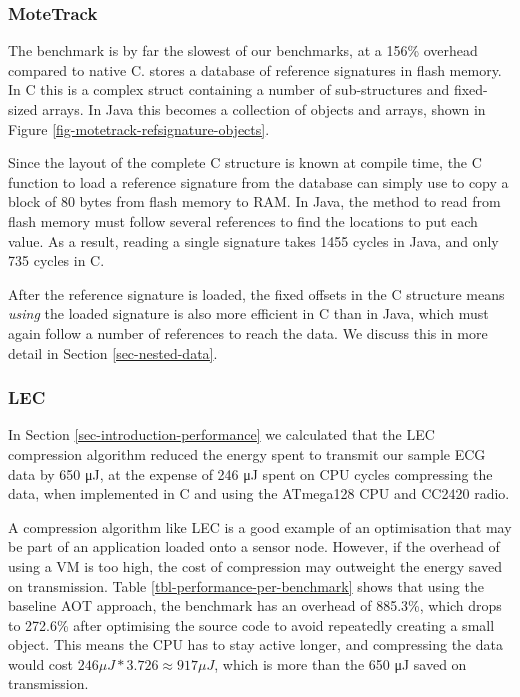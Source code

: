 \subsubsection{MoteTrack}
The  benchmark is by far the slowest of our benchmarks, at a 156\% overhead compared to native C.  stores a database of reference signatures in flash memory. In C this is a complex struct containing a number of sub-structures and fixed-sized arrays. In Java this becomes a collection of objects and arrays, shown in Figure \ref{fig-motetrack-refsignature-objects}.

Since the layout of the complete C structure is known at compile time, the C function to load a reference signature from the database can simply use  to copy a block of 80 bytes from flash memory to RAM. In Java, the method to read from flash memory must follow several references to find the locations to put each value. As a result, reading a single signature takes 1455 cycles in Java, and only 735 cycles in C.

After the reference signature is loaded, the fixed offsets in the C structure means \emph{using} the loaded signature is also more efficient in C than in Java, which must again follow a number of references to reach the data. We discuss this in more detail in Section \ref{sec-nested-data}.

\subsubsection{LEC}
In Section \ref{sec-introduction-performance} we calculated that the LEC compression algorithm reduced the energy spent to transmit our sample ECG data by 650 μJ, at the expense of 246 μJ spent on CPU cycles compressing the data, when implemented in C and using the ATmega128 CPU and CC2420 radio.

A compression algorithm like LEC is a good example of an optimisation that may be part of an application loaded onto a sensor node. However, if the overhead of using a VM is too high, the cost of compression may outweight the energy saved on transmission. Table \ref{tbl-performance-per-benchmark} shows that using the baseline AOT approach, the  benchmark has an overhead of 885.3\%, which drops to 272.6\% after optimising the source code to avoid repeatedly creating a small object. This means the CPU has to stay active longer, and compressing the data would cost $246 \mu J * 3.726 \approx 917 \mu J$, which is more than the 650 μJ saved on transmission.

